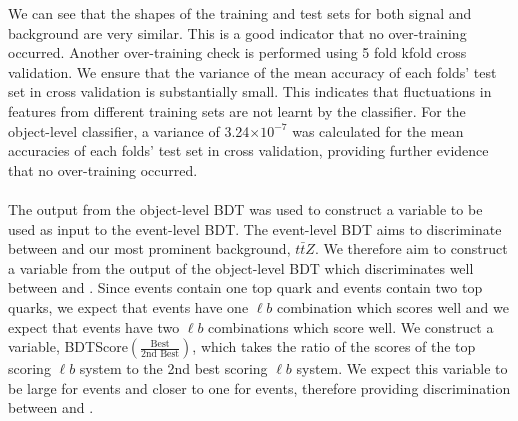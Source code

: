 We can see that the shapes of the training and test sets for both signal and background are very similar. This is a good indicator that no over-training occurred. Another over-training check is performed using 5 fold kfold cross validation. We ensure that the variance of the mean accuracy of each folds' test set in cross validation is substantially small. This indicates that fluctuations in features from different training sets are not learnt by the classifier. For the object-level classifier, a variance of 3.24$\times 10^{-7}$ was calculated for the mean accuracies of each folds' test set in cross validation, providing further evidence that no over-training occurred. \\\\

The output from the object-level BDT was used to construct a variable to be used as input to the event-level BDT. The event-level BDT aims to discriminate between \tWZ and our most prominent background, $t\bar{t}Z$. We therefore aim to construct a variable from the output of the object-level BDT which discriminates well between \tWZ and \ttZ. Since \tWZ events contain one top quark and \ttZ events contain two top quarks, we expect that \tWZ events have one $\ell b$ combination which scores well and we expect that \ttZ events have two $\ell b$ combinations which score well. We construct a variable, BDTScore$(\frac{\text{Best}}{\text{2nd Best}})$, which takes the ratio of the scores of the top scoring $\ell b$ system to the 2nd best scoring $\ell b$ system. We expect this variable to be large for \tWZ events and closer to one for \ttZ events, therefore providing discrimination between \tWZ and \ttZ.\\\\


